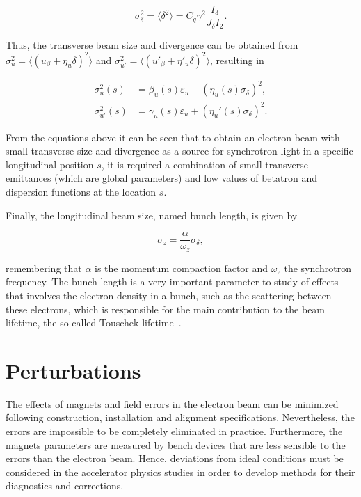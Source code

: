 \begin{equation}
    \sigma^2_{\delta} = \langle \delta ^2\rangle = C_q \gamma^2\dfrac{I_3}{J_{\delta}I_2}.
\end{equation}

Thus, the transverse beam size and divergence can be obtained from $\sigma^2_u = \langle\left(u_\beta + \eta_u \delta\right)^2\rangle$ and $\sigma^2_{u'} = \langle\left(u'_\beta + \eta'_u \delta\right)^2\rangle$, resulting in

\begin{align}
 \sigma^2_u(s) &= \beta_u (s) \varepsilon_u + \left(\eta_u(s) \sigma_{\delta}\right)^2, \\
 \sigma^2_{u'}(s) &= \gamma_u (s) \varepsilon_u + \left(\eta_{u}'(s) \sigma_{\delta}\right)^2.
\end{align}

From the equations above it can be seen that to obtain an electron beam with small transverse size and divergence as a source for synchrotron light in a specific longitudinal position $s$, it is required a combination of small transverse emittances (which are global parameters) and low values of betatron and dispersion functions at the location $s$.

Finally, the longitudinal beam size, named bunch length, is given by

\begin{equation}
    \sigma_{z} = \dfrac{\alpha}{\omega_z} \sigma_{\delta},
\end{equation}

remembering that $\alpha$ is the momentum compaction factor and $\omega_z$ the synchrotron frequency. The bunch length is a very important parameter to study of effects that involves the electron density in a bunch, such as the scattering between these electrons, which is responsible for the main contribution to the beam lifetime, the so-called Touschek lifetime~\cite{touschek}.

\section{Perturbations}\label{perturbations}

The effects of magnets and field errors in the electron beam can be minimized following construction, installation and alignment specifications. Nevertheless, the errors are impossible to be completely eliminated in practice. Furthermore, the magnets parameters are measured by bench devices that are less sensible to the errors than the electron beam. Hence, deviations from ideal conditions must be considered in the accelerator physics studies in order to develop methods for their diagnostics and corrections.

